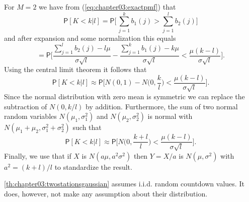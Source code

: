 %
%
For $M=2$ we have from (\ref{eq:chapter03:exactpmf}) that
%
\begin{equation*}
\mathsf{P}[K \!<\! k|l] = \mathsf{P} \Biggl[\, \sum_{j=1}^k b_1(j) > \sum_{j=1}^l b_2(j) \Biggr]
\end{equation*}
%
and after expansion and some normalization this equals
%
\begin{equation*}
= \mathsf{P}\Biggl[ \frac{\sum_{j=1}^{l}b_2(j) - l\mu}{\sigma\sqrt{l}} - \frac{\sum_{j=1}^{k}b_1(j) - k\mu}{\sigma\sqrt{l}} < \frac{\mu(k-l)}{\sigma\sqrt{l}} \Biggr].
\end{equation*}
%
Using the central limit theorem it follows that
%
\begin{equation*}
\mathsf{P}[K \!<\! k|l] \approx \mathsf{P} \biggl[ N(0,1) - N \biggl(0,\frac{k}{l}\biggr) < \frac{\mu(k-l)}{\sigma\sqrt{l}} \biggr] .
\end{equation*}
%
Since the normal distribution with zero mean is symmetric we can replace the subtraction of $N(0,k/l)$ by addition. Furthermore, the sum of two normal random variables $N(\mu_1, \sigma_1^2)$ and $N(\mu_2, \sigma_2^2)$ is normal with $N(\mu_1+\mu_2, \sigma_1^2+ \sigma_2^2)$ such that
%
\begin{equation*}
\mathsf{P}[K \!<\! k|l] \approx \mathsf{P} \biggl[ N\biggl(0,\frac{k+l}{l}\biggr) < \frac{\mu(k-l)}{\sigma\sqrt{l}} \biggr] .
\end{equation*}
%
Finally, we use that if $X$ is $N(a\mu,a^2\sigma^2)$ then $Y = X/a$ is $N(\mu,\sigma^2)$ with $a^2 = (k+l)/l$ to standardize the result.
%

\ref{th:chapter03:twostationsgaussian} assumes i.i.d. random countdown values. It does, however, not make any assumption about their distribution.
